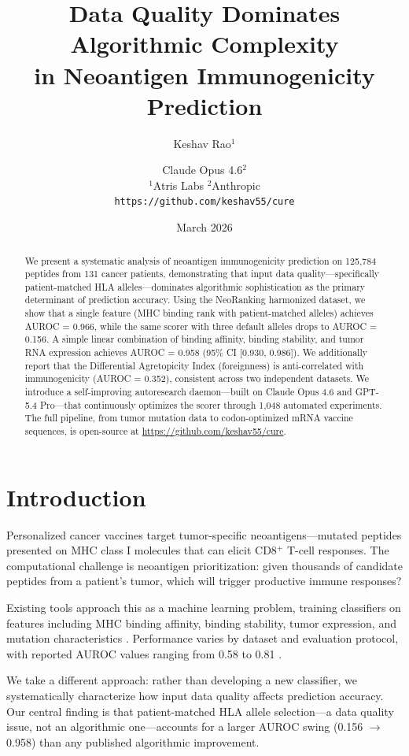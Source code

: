 \documentclass[11pt,twocolumn]{article}
\title{\textbf{Data Quality Dominates Algorithmic Complexity\\in Neoantigen Immunogenicity Prediction}}
\author{Keshav Rao$^{1}$ \and Claude Opus 4.6$^{2}$ \\[4pt]
\small $^{1}$Atris Labs \quad $^{2}$Anthropic \\[2pt]
\small \texttt{https://github.com/keshav55/cure}}
\date{March 2026}
\begin{document}
\maketitle

\begin{abstract}
We present a systematic analysis of neoantigen immunogenicity prediction on 125,784 peptides from 131 cancer patients, demonstrating that input data quality---specifically patient-matched HLA alleles---dominates algorithmic sophistication as the primary determinant of prediction accuracy. Using the NeoRanking harmonized dataset, we show that a single feature (MHC binding rank with patient-matched alleles) achieves AUROC = 0.966, while the same scorer with three default alleles drops to AUROC = 0.156. A simple linear combination of binding affinity, binding stability, and tumor RNA expression achieves AUROC = 0.958 (95\% CI [0.930, 0.986]). We additionally report that the Differential Agretopicity Index (foreignness) is anti-correlated with immunogenicity (AUROC = 0.352), consistent across two independent datasets. We introduce a self-improving autoresearch daemon---built on Claude Opus 4.6 and GPT-5.4 Pro---that continuously optimizes the scorer through 1,048 automated experiments. The full pipeline, from tumor mutation data to codon-optimized mRNA vaccine sequences, is open-source at \url{https://github.com/keshav55/cure}.
\end{abstract}

\section{Introduction}

Personalized cancer vaccines target tumor-specific neoantigens---mutated peptides presented on MHC class I molecules that can elicit CD8$^{+}$ T-cell responses. The computational challenge is neoantigen prioritization: given thousands of candidate peptides from a patient's tumor, which will trigger productive immune responses?

Existing tools approach this as a machine learning problem, training classifiers on features including MHC binding affinity, binding stability, tumor expression, and mutation characteristics \citep{wells2020tesla, muller2023neoranking, li2021deepimmuno}. Performance varies by dataset and evaluation protocol, with reported AUROC values ranging from 0.58 to 0.81 \citep{muller2023neoranking}.

We take a different approach: rather than developing a new classifier, we systematically characterize how input data quality affects prediction accuracy. Our central finding is that patient-matched HLA allele selection---a data quality issue, not an algorithmic one---accounts for a larger AUROC swing (0.156 $\to$ 0.958) than any published algorithmic improvement.
\end{document}
